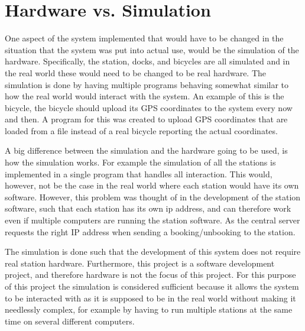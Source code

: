 \section*{Hardware vs. Simulation}
One aspect of the system implemented that would have to be changed in the situation that the system was put into actual use, would be the simulation of the hardware.
Specifically, the station, docks, and bicycles are all simulated and in the real world these would need to be changed to be real hardware.
The simulation is done by having multiple programs behaving somewhat similar to how the real world would interact with the system.
An example of this is the bicycle, the bicycle should upload its GPS coordinates to the system every now and then. 
A program for this was created to upload GPS coordinates that are loaded from a file instead of a real bicycle reporting the actual coordinates.

A big difference between the simulation and the hardware going to be used, is how the simulation works.
For example the simulation of all the stations is implemented in a single program that handles all interaction. 
This would, however, not be the case in the real world where each station would have its own software.
However, this problem was thought of in the development of the station software, such that each station has its own ip address, and can therefore work even if multiple computers are running the station software. As the central server requests the right IP address when sending a booking/unbooking to the station.

The simulation is done such that the development of this system does not require real station hardware.
Furthermore, this project is a software development project, and therefore hardware is not the focus of this project.
For this purpose of this project the simulation is considered sufficient because it allows the system to be interacted with as it is supposed to be in the real world without making it needlessly complex, for example by having to run multiple stations at the same time on several different computers.